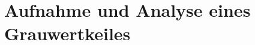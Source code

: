 \documentclass[12pt, oneside, a4paper, \docLanguage]{report}
\begin{document}

\setcounter{section}{0}



\clearpage

%
%


%
%


%
%





\setcounter{page}{1} 
\pagestyle{default}

%
%
\chapter{Aufnahme und Analyse eines Grauwertkeiles}
\end{document}
